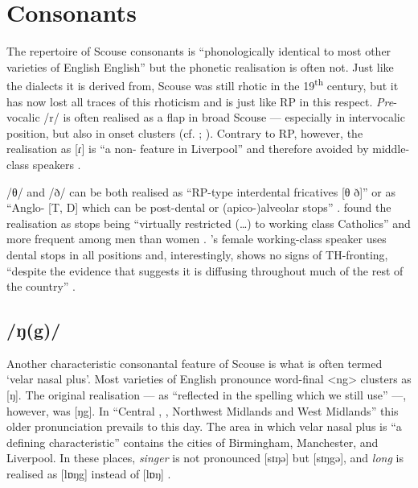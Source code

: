 	\section{Consonants}\label{sec.var.con}

The repertoire of Scouse consonants is ``phonologically identical to most other varieties of English English'' \citep[351]{watson2007} but the phonetic realisation is often not.
Just like the  dialects it is derived from, Scouse was still rhotic in the 19\textsuperscript{th} century, but it has now lost all traces of this rhoticism \citep[cf.][149]{knowles1997} and is just like RP in this respect.
\emph{Pre}-vocalic /r/ is often realised as a flap in broad Scouse --- especially in intervocalic position, but also in onset clusters (cf. \citealt[107 and 329--330]{knowles1973}; \citealt[352]{watson2007}).
Contrary to RP, however, the realisation as [ɾ] is ``a non- feature in Liverpool'' and therefore avoided by middle-class speakers \citep[329]{knowles1973}.

/θ/ and /ð/ can be both realised as ``RP-type interdental fricatives [θ ð]'' or as ``Anglo- [T, D] which can be post-dental or (apico-)alveolar stops'' \citep[323]{knowles1973}.
\citeauthor{knowles1973} found the realisation as stops being ``virtually restricted (\ldots) to working class Catholics'' and more frequent among men than women \citep[323--324]{knowles1973}.
\cite{watson2007}'s female working-class speaker uses dental stops in all positions and, interestingly, shows no signs of TH-fronting, ``despite the evidence that suggests it is diffusing throughout much of the rest of the country'' \parencite[cf.][352]{watson2007}.

		\subsection{/ŋ(g)/}\label{sec.var.con.ng}

Another characteristic consonantal feature of Scouse is what is often termed `velar nasal plus'.
Most varieties of English pronounce word-final <ng> clusters as [ŋ].
The original realisation --- as ``reflected in the spelling which we still use'' \citep[58]{trudgill1999} ---, however, was [ŋg]. In ``Central , , Northwest Midlands and West Midlands'' \citep[58]{trudgill1999} this older pronunciation prevails to this day. 
The area in which velar nasal plus is ``a defining characteristic'' \citep[58]{trudgill1999} contains the cities of Birmingham, Manchester, and Liverpool.
In these places, \emph{singer} is not pronounced [sɪŋə] but [sɪŋgə], and \emph{long} is realised as [lɒŋg] instead of [lɒŋ] \citep[cf.][58]{trudgill1999}.

